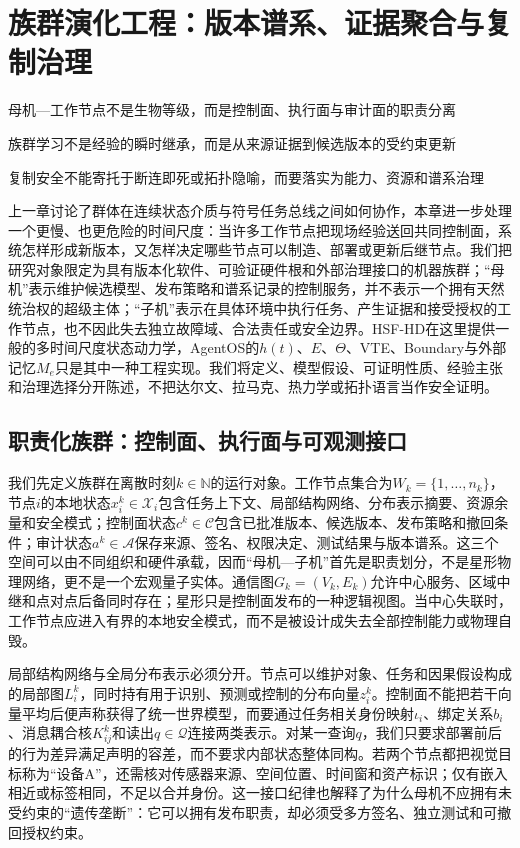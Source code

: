 \chapter{族群演化工程：版本谱系、证据聚合与复制治理}
\label{chp:hive_evolution_engineering}

\begin{introduction}
    \item 母机—工作节点不是生物等级，而是控制面、执行面与审计面的职责分离
    \item 族群学习不是经验的瞬时继承，而是从来源证据到候选版本的受约束更新
    \item 复制安全不能寄托于断连即死或拓扑隐喻，而要落实为能力、资源和谱系治理
\end{introduction}

上一章讨论了群体在连续状态介质与符号任务总线之间如何协作，本章进一步处理一个更慢、也更危险的时间尺度：当许多工作节点把现场经验送回共同控制面，系统怎样形成新版本，又怎样决定哪些节点可以制造、部署或更新后继节点。我们把研究对象限定为具有版本化软件、可验证硬件根和外部治理接口的机器族群；“母机”表示维护候选模型、发布策略和谱系记录的控制服务，并不表示一个拥有天然统治权的超级主体；“子机”表示在具体环境中执行任务、产生证据和接受授权的工作节点，也不因此失去独立故障域、合法责任或安全边界。HSF-HD在这里提供一般的多时间尺度状态动力学，AgentOS的$h(t)$、$E$、$\Theta$、VTE、Boundary与外部记忆$M_e$只是其中一种工程实现。我们将定义、模型假设、可证明性质、经验主张和治理选择分开陈述，不把达尔文、拉马克、热力学或拓扑语言当作安全证明。

\section{职责化族群：控制面、执行面与可观测接口}
\label{sec:hive_topology}

我们先定义族群在离散时刻$k\in\mathbb{N}$的运行对象。工作节点集合为$W_k=\{1,\ldots,n_k\}$，节点$i$的本地状态$x_i^k\in\mathcal{X}_i$包含任务上下文、局部结构网络、分布表示摘要、资源余量和安全模式；控制面状态$c^k\in\mathcal{C}$包含已批准版本、候选版本、发布策略和撤回条件；审计状态$a^k\in\mathcal{A}$保存来源、签名、权限决定、测试结果与版本谱系。这三个空间可以由不同组织和硬件承载，因而“母机—子机”首先是职责划分，不是星形物理网络，更不是一个宏观量子实体。通信图$G_k=(V_k,E_k)$允许中心服务、区域中继和点对点后备同时存在；星形只是控制面发布的一种逻辑视图。当中心失联时，工作节点应进入有界的本地安全模式，而不是被设计成失去全部控制能力或物理自毁。

局部结构网络与全局分布表示必须分开。节点可以维护对象、任务和因果假设构成的局部图$L_i^k$，同时持有用于识别、预测或控制的分布向量$z_i^k$。控制面不能把若干向量平均后便声称获得了统一世界模型，而要通过任务相关身份映射$\iota_i$、绑定关系$b_i$、消息耦合核$K_{ij}^k$和读出$q\in\mathcal{Q}$连接两类表示。对某一查询$q$，我们只要求部署前后的行为差异满足声明的容差，而不要求内部状态整体同构。若两个节点都把视觉目标称为“设备A”，还需核对传感器来源、空间位置、时间窗和资产标识；仅有嵌入相近或标签相同，不足以合并身份。这一接口纪律也解释了为什么母机不应拥有未受约束的“遗传垄断”：它可以拥有发布职责，却必须受多方签名、独立测试和可撤回授权约束。

